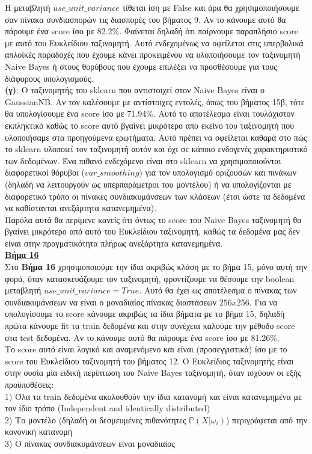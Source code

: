 \documentclass[11pt]{article} %
\begin{document}
Η μεταβλητή $use\_unit\_variance$ τίθεται ίση με False και άρα θα χρησιμοποιήσουμε σαν πίνακα συνδιασπορών τις διασπορές του βήματος 9. Αν το κάνουμε αυτό θα πάρουμε ένα score ίσο με 82.2\%. Φαίνεται δηλαδή ότι παίρνουμε παραπλήσιο score με αυτό του Ευκλείδιου ταξινομητή. Αυτό ενδεχομένως να οφείλεται στις υπερβολικά απλοϊκές παραδοχές που έχουμε κάνει προκειμένου να υλοποιήσουμε τον ταξινομητή Naive Bayes ή στους θορύβους που έχουμε επιλέξει να προσθέσουμε για τους διάφορους υπολογισμούς.\\

\textbf{(γ)}: Ο ταξινομητής του sklearn που αντιστοιχεί στον Naive Bayes είναι ο GaussianNB. Αν τον καλέσουμε με αντίστοιχες εντολές, όπως του βήματος 15β, τότε θα υπολογίσουμε ένα score ίσο με 71.94\%. Αυτό το αποτέλεσμα είναι τουλάχιστον εκπληκτικό καθώς το score αυτό βγαίνει μικρότερο απο εκείνο του ταξινομητή που υλοποιήσαμε στα προηγούμενα ερωτήματα. Αυτό πρέπει να οφείλεται καθαρά στο πώς το sklearn υλοποιεί τον ταξινομητή αυτόν και όχι σε κάποιο ενδογενές χαρακτηριστικό των δεδομένων. Ένα πιθανό ενδεχόμενο είναι στο sklearn να χρησιμοποιούνται διαφορετικοί θόρυβοι ($var\_smoothing$) για τον υπολογισμό οριζουσών και πινάκων (δηλαδή να λειτουργούν ως υπερπαράμετροι του μοντέλου) ή να υπολογίζονται με διαφορετικό τρόπο οι πίνακες συνδιακυμάνσεων των κλάσεων (έτσι ώστε τα δεδομένα να καθίστανται ανεξάρτητα κατανεμημένα). \\

Παρόλα αυτά θα περίμενε κανείς ότι όντως το score του Naive Bayes ταξινομητή θα βγαίνει μικρότερο από αυτό του Ευκλείδιου ταξινομητή, καθώς τα δεδομένα μας δεν είναι στην πραγματικότητα πλήρως ανεξάρτητα κατανεμημένα. \\

\underline{\textbf{Βήμα 16}}\\

Στο \textbf{Βήμα 16} χρησιμοποιούμε την ίδια ακριβώς κλάση με το βήμα 15, μόνο αυτή την φορά, όταν κατασκευάζουμε τον ταξινομητή, φροντίζουμε να θέσουμε την boolean μεταβλητή $use\_unit\_variance = True$. Αυτό θα έχει ως αποτέλεσμα ο πίνακας των συνδιακυμάνσεων να είναι ο μοναδιαίος πίνακας διαστάσεων $256x256$. Για να υπολογίσουμε το score κάνουμε ακριβώς τα ίδια βήματα με το βήμα 15, δηλαδή πρώτα κάνουμε fit τα train δεδομένα και στην συνέχεια καλούμε την μέθοδο score στα test δεδομένα. Αν το κάνουμε αυτό θα πάρουμε ένα score ίσο με 81.26\%.\\

Το score αυτό είναι λογικό και αναμενόμενο και είναι (προσεγγιστικά) ίσο με το score του Ευκλείδιου ταξινομητή του βήματος 12. Ο Ευκλείδιος ταξινομητής είναι στην ουσία μία ειδική περίπτωση του Naive Bayes ταξινομητή, όταν ισχύουν οι εξής προϋποθέσεις:\\
1) Όλα τα train δεδομένα ακολουθούν την ίδια κατανομή και είναι κατανεμημένα με τον ίδιο τρόπο (Independent and identically distributed)\\
2) Το μοντέλο (δηλαδή οι δεσμευμένες πιθανότητες $\mathbb{P}(X|\omega_{i})$) περιγράφεται από την κανονική κατανομή\\
3) Ο πίνακας συνδιακυμάνσεων είναι μοναδιαίος\\
\end{document}
